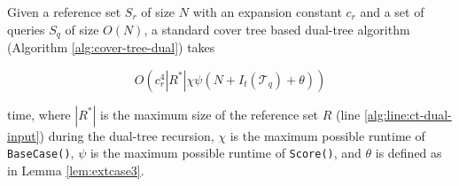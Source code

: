 \begin{thm}
\label{thm:ct-runtime}
Given a reference set $S_r$ of size $N$ with an expansion constant $c_r$ and a
set of queries $S_q$ of size $O(N)$, a standard cover tree based dual-tree
algorithm (Algorithm \ref{alg:cover-tree-dual}) takes

\begin{equation}
O\left(c_r^4 | R^* | \chi \psi (N + I_t(\mathscr{T}_q) + \theta)\right)
\end{equation}

\noindent time, where $ | R^* | $ is the maximum size of the reference set $R$
(line \ref{alg:line:ct-dual-input}) during the dual-tree recursion, $\chi$ is
the maximum possible runtime of \texttt{BaseCase()}, $\psi$ is the maximum
possible runtime of \texttt{Score()}, and $\theta$ is defined as in Lemma
\ref{lem:extcase3}.
\end{thm}

